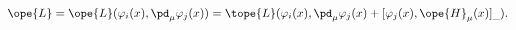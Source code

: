 \begin{equation}
			\label{8.8}
\ope{L}
= \ope{L}(\varphi_i(x),\pd_\mu\varphi_j(x))
= \tope{L}(\varphi_i(x),\pd_\mu\varphi_j(x)
	+ [\varphi_j(x),\ope{H}_\mu(x)]_{\_} ) .
	\end{equation}

